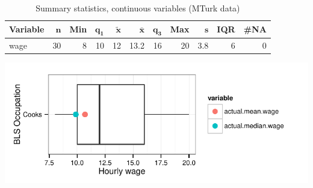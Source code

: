 \documentclass[a4paper,10pt]{article}\usepackage[]{graphicx}\usepackage[]{color}
\makeatletter
\def\maxwidth{ %
  \ifdim\Gin@nat@width>\linewidth
    \linewidth
  \else
    \Gin@nat@width
  \fi
}
\makeatother
\begin{document}
\begin{table}[ht]
\centering
{\footnotesize
\begin{tabular}{lrrrrrrrrrr}
 \textbf{Variable} & $\mathbf{n}$ & \textbf{Min} & $\mathbf{q_1}$ & $\mathbf{\widetilde{x}}$ & $\mathbf{\bar{x}}$ & $\mathbf{q_3}$ & \textbf{Max} & $\mathbf{s}$ & \textbf{IQR} & \textbf{\#NA} \\ 
  \hline
wage & 30 & 8 & 10 & 12 & 13.2 & 16 & 20 & 3.8 & 6 & 0 \\ 
  \end{tabular}
}
\caption{Summary statistics, continuous variables (MTurk data)} 
\label{tab2:35-2010}
\end{table}


{\centering \includegraphics[width=\maxwidth]{figure/unnamed-chunk-213} 

}
\end{document}
